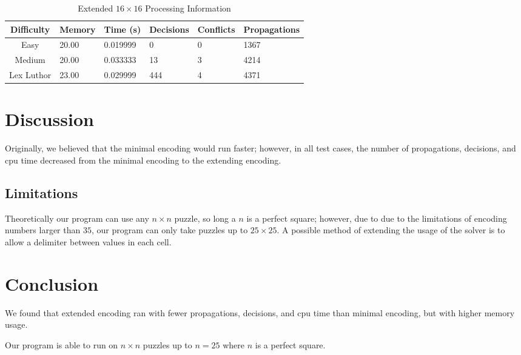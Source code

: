 \documentclass[conference,draftclsnofoot]{IEEEtran}
\begin{document}
\begin{table}[!h]
	\centering
	\begin{tabular}{c | l l p{20pt} p{20pt} l }
		Difficulty & Memory & Time (s) & Decisions &
		Conflicts & Propagations \\\hline
		Easy 		& 20.00 & 0.019999 & 0 & 0 & 1367\\
		Medium 		& 20.00 & 0.033333 & 13 & 3 & 4214\\
		Lex Luthor 	& 23.00 & 0.029999 & 444 & 4 & 4371
	\end{tabular}
	\caption{Extended $16\times 16$ Processing Information}
	\label{tab:summary}
\end{table}
\FloatBarrier



\section{Discussion}
Originally, we believed that the minimal encoding would run faster; however, in
all test cases, the number of propagations, decisions, and cpu time decreased
from the minimal encoding to the extending encoding.

\subsection{Limitations}
Theoretically our program can use any $n \times n$ puzzle, so long a $n$ is a
perfect square; however, due to due to the limitations of encoding numbers
larger than $35$, our program can only take puzzles up to $25 \times 25$. A
possible method of extending the usage of the solver is to allow a delimiter
between values in each cell.

\section{Conclusion}
We found that extended encoding ran with fewer propagations, decisions, and cpu
time than minimal encoding, but with higher memory usage.

Our program is able to run on $n \times n$ puzzles up to $n = 25$ where $n$ is
a perfect square.
\end{document}

